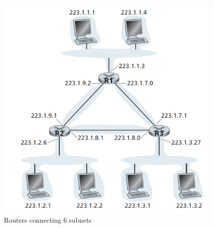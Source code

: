 \documentclass[a4paper]{article}
\theoremstyle{plain}
\theoremstyle{definition}
\begin{document}
\begin{figure}[!h]
    \centering
    \includegraphics[scale=0.7]{cn8.png}
    \caption{Routers connecting 6 subnets}
    \label{fig:my_label_8}
\end{figure}
\end{document}
